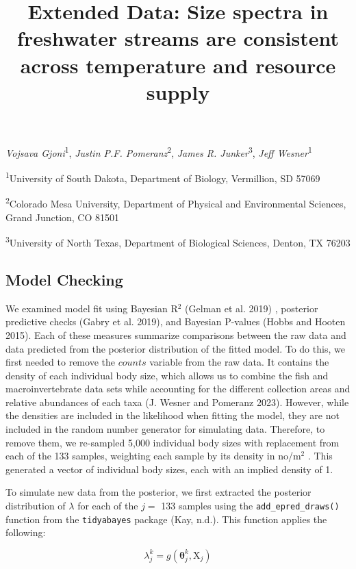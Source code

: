 \documentclass[
  12pt,
]{article}
\title{Extended Data: Size spectra in freshwater streams are consistent
across temperature and resource supply}
\author{}
\date{\vspace{-2.5em}}
\begin{document}
\maketitle

\emph{Vojsava Gjoni}\textsuperscript{1}, \emph{Justin P.F.
Pomeranz}\textsuperscript{2}, \emph{James R. Junker}\textsuperscript{3},
\emph{Jeff Wesner}\textsuperscript{1}

\textsuperscript{1}University of South Dakota, Department of Biology,
Vermillion, SD 57069

\textsuperscript{2}Colorado Mesa University, Department of Physical and
Environmental Sciences, Grand Junction, CO 81501

\textsuperscript{3}University of North Texas, Department of Biological
Sciences, Denton, TX 76203

\hypertarget{model-checking}{%
\subsection{Model Checking}\label{model-checking}}

We examined model fit using Bayesian R\(^2\) (Gelman et al. 2019) ,
posterior predictive checks (Gabry et al. 2019), and Bayesian P-values
(Hobbs and Hooten 2015). Each of these measures summarize comparisons
between the raw data and data predicted from the posterior distribution
of the fitted model. To do this, we first needed to remove the
\(counts\) variable from the raw data. It contains the density of each
individual body size, which allows us to combine the fish and
macroinvertebrate data sets while accounting for the different
collection areas and relative abundances of each taxa (J. Wesner and
Pomeranz 2023). However, while the densities are included in the
likelihood when fitting the model, they are not included in the random
number generator for simulating data. Therefore, to remove them, we
re-sampled 5,000 individual body sizes with replacement from each of the
133 samples, weighting each sample by its density in no/m\(^2\) . This
generated a vector of individual body sizes, each with an implied
density of 1.

To simulate new data from the posterior, we first extracted the
posterior distribution of \(\lambda\) for each of the \(j =\) 133
samples using the \texttt{add\_epred\_draws()} function from the
\texttt{tidyabayes} package (Kay, n.d.). This function applies the
following:

\[
\lambda_j^k = g(\boldsymbol{ \theta}^k_j, \text{X}_j)
\]
\end{document}
